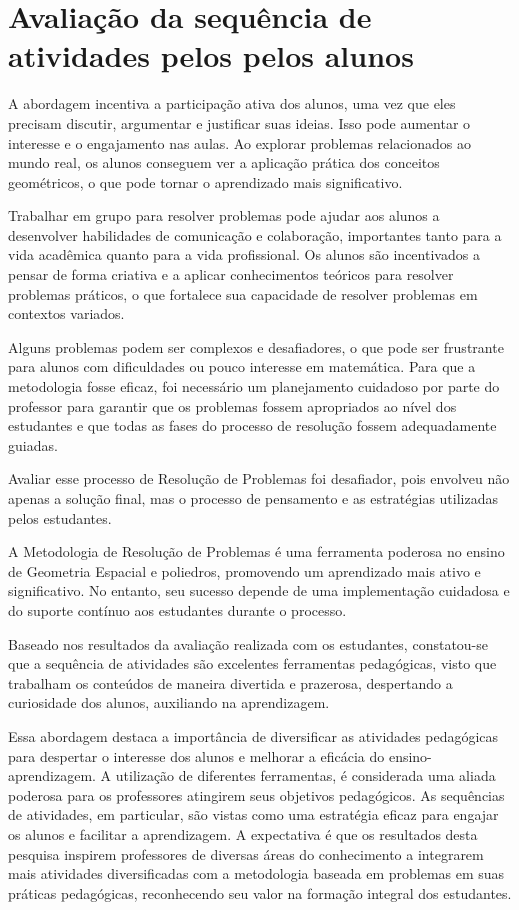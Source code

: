 \section{Avaliação da sequência de atividades pelos pelos alunos}

A abordagem incentiva a participação ativa dos alunos, uma vez que eles precisam discutir, argumentar e justificar suas ideias. Isso pode aumentar o interesse e o engajamento nas aulas. Ao explorar problemas relacionados ao mundo real, os alunos conseguem ver a aplicação prática dos conceitos geométricos, o que pode tornar o aprendizado mais significativo.

Trabalhar em grupo para resolver problemas pode ajudar aos alunos a desenvolver habilidades de comunicação e colaboração, importantes tanto para a vida acadêmica quanto para a vida profissional. Os alunos são incentivados a pensar de forma criativa e a aplicar conhecimentos teóricos para resolver problemas práticos, o que fortalece sua capacidade de resolver problemas em contextos variados.

Alguns problemas podem ser complexos e desafiadores, o que pode ser frustrante para alunos com dificuldades ou pouco interesse em matemática. Para que a metodologia fosse eficaz, foi necessário um planejamento cuidadoso por parte do professor para garantir que os problemas fossem apropriados ao nível dos estudantes e que todas as fases do processo de resolução fossem adequadamente guiadas.

Avaliar esse processo de Resolução de Problemas foi desafiador, pois envolveu não apenas a solução final, mas o processo de pensamento e as estratégias utilizadas pelos estudantes.

A Metodologia de Resolução de Problemas é uma ferramenta poderosa no ensino de Geometria Espacial e poliedros, promovendo um aprendizado mais ativo e significativo. No entanto, seu sucesso depende de uma implementação cuidadosa e do suporte contínuo aos estudantes durante o processo.

Baseado nos resultados da avaliação realizada com os estudantes, constatou-se que a sequência de atividades são excelentes ferramentas pedagógicas, visto que trabalham os conteúdos de maneira divertida e prazerosa, despertando a curiosidade dos alunos, auxiliando na aprendizagem.

Essa abordagem destaca a importância de diversificar as atividades pedagógicas para despertar o interesse dos alunos e melhorar a eficácia do ensino-aprendizagem. A utilização de diferentes ferramentas, é considerada uma aliada poderosa para os professores atingirem seus objetivos pedagógicos. As sequências de atividades, em particular, são vistas como uma estratégia eficaz para engajar os alunos e facilitar a aprendizagem. A expectativa é que os resultados desta pesquisa inspirem professores de diversas áreas do conhecimento a integrarem mais atividades diversificadas com a metodologia baseada em problemas em suas práticas pedagógicas, reconhecendo seu valor na formação integral dos estudantes.

